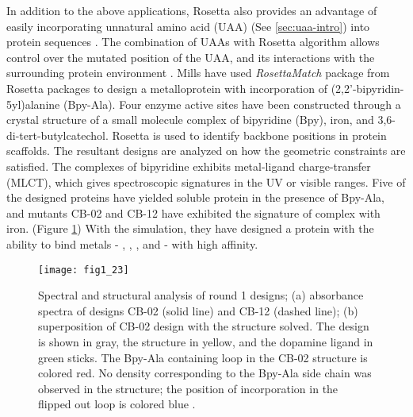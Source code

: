 \begin{refsection}
In addition to the above applications, Rosetta also provides an
advantage of easily incorporating unnatural amino acid (UAA) (See
\ref{sec:uaa-intro}) into protein sequences \cite{Renfrew2012b}. The
combination of UAAs with Rosetta algorithm allows control over the mutated
position of the UAA, and its interactions with the surrounding
protein environment \cite{Renfrew2012b}. Mills  have used
\emph{RosettaMatch} package from Rosetta packages to design a metalloprotein
with incorporation of (2,2’-bipyridin-5yl)alanine (Bpy-Ala)\cite{Mills2013}.
Four enzyme active sites have been constructed through a crystal structure of
a small molecule complex of bipyridine (Bpy), iron, and
3,6-di-tert-butylcatechol. Rosetta is used to identify backbone positions
in protein scaffolds. The resultant designs are analyzed on how the geometric
constraints are satisfied. The complexes of bipyridine exhibits metal-ligand
charge-transfer (MLCT), which gives spectroscopic signatures in the UV or
visible ranges. Five of the designed proteins have yielded soluble protein in
the presence of Bpy-Ala, and mutants CB-02 and CB-12 have exhibited the
signature of complex with iron. (Figure \ref{fig:rosetta-uaa}) With the
simulation, they have designed a protein with the ability to bind metals -
, , , and  - with high
affinity. 
\begin{figure}[htbp] \centering \texttt{[image: fig1\_23]}
    \caption[Spectral and structural analysis of round 1 designs; (a)
        absorbance spectra of designs CB-02 (solid line) and CB-12 (dashed
        line); (b) superposition of CB-02 design with the structure solved. The
        design is shown in gray, the structure in yellow, and the dopamine
        ligand in green sticks. The Bpy-Ala containing loop in the CB-02
        structure is colored red. No density corresponding to the Bpy-Ala side
        chain was observed in the structure; the position of incorporation in
    the flipped out loop is colored blue.] {Spectral and structural analysis of
        round 1 designs; (a) absorbance spectra of designs CB-02 (solid line)
        and CB-12 (dashed line); (b) superposition of CB-02 design with the
        structure solved. The design is shown in gray, the structure in yellow,
        and the dopamine ligand in green sticks. The Bpy-Ala containing loop in
        the CB-02 structure is colored red. No density corresponding to the
        Bpy-Ala side chain was observed in the structure; the position of
        incorporation in the flipped out loop is colored blue \cite{Mills2013}.}
        \label{fig:rosetta-uaa} 
\end{figure}


\end{refsection}
